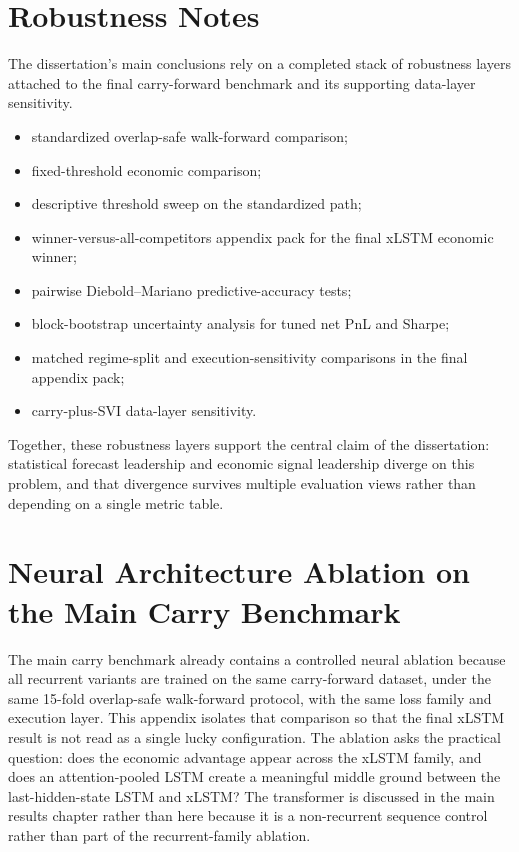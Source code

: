 \documentclass[12pt]{report}
\begin{document}
\chapter{Robustness Notes}
The dissertation's main conclusions rely on a completed stack of robustness layers attached to the final carry-forward benchmark and its supporting data-layer sensitivity.

\begin{itemize}[leftmargin=1.2cm]
    \item standardized overlap-safe walk-forward comparison;
    \item fixed-threshold economic comparison;
    \item descriptive threshold sweep on the standardized path;
    \item winner-versus-all-competitors appendix pack for the final xLSTM economic winner;
    \item pairwise Diebold--Mariano predictive-accuracy tests;
    \item block-bootstrap uncertainty analysis for tuned net PnL and Sharpe;
    \item matched regime-split and execution-sensitivity comparisons in the final appendix pack;
    \item carry-plus-SVI data-layer sensitivity.
\end{itemize}

Together, these robustness layers support the central claim of the dissertation: statistical forecast leadership and economic signal leadership diverge on this problem, and that divergence survives multiple evaluation views rather than depending on a single metric table.

\chapter{Neural Architecture Ablation on the Main Carry Benchmark}
The main carry benchmark already contains a controlled neural ablation because all recurrent variants are trained on the same carry-forward dataset, under the same 15-fold overlap-safe walk-forward protocol, with the same loss family and execution layer. This appendix isolates that comparison so that the final xLSTM result is not read as a single lucky configuration. The ablation asks the practical question: does the economic advantage appear across the xLSTM family, and does an attention-pooled LSTM create a meaningful middle ground between the last-hidden-state LSTM and xLSTM? The transformer is discussed in the main results chapter rather than here because it is a non-recurrent sequence control rather than part of the recurrent-family ablation.
\end{document}
